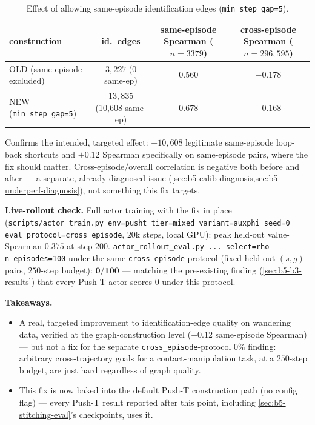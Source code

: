 \documentclass[11pt]{article}
\begin{document}
\begin{table}[h]
\centering
\small
\caption{Effect of allowing same-episode identification edges (\texttt{min\_step\_gap=5}).}
\begin{tabular}{lccc}
\toprule
construction & id.\ edges & same-episode Spearman ($n{=}3379$) & cross-episode Spearman ($n{=}296{,}595$) \\
\midrule
OLD (same-episode excluded) & $3{,}227$ (0 same-ep) & $0.560$ & $-0.178$ \\
NEW (\texttt{min\_step\_gap=5}) & $13{,}835$ (10,608 same-ep) & $\mathbf{0.678}$ & $-0.168$ \\
\bottomrule
\end{tabular}
\end{table}

Confirms the intended, targeted effect: $+10{,}608$ legitimate same-episode loop-back shortcuts
and $+0.12$ Spearman specifically on same-episode pairs, where the fix should matter.
Cross-episode/overall correlation is negative both before and after --- a separate,
already-diagnosed issue (\cref{sec:b5-calib-diagnosis,sec:b5-underperf-diagnosis}), not
something this fix targets.

\textbf{Live-rollout check.} Full actor training with the fix in place
(\texttt{scripts/actor\_train.py env=pusht tier=mixed variant=auxphi seed=0
eval\_protocol=cross\_episode}, $20$k steps, local GPU): peak held-out value-Spearman $0.375$ at
step $200$. \texttt{actor\_rollout\_eval.py ... select=rho n\_episodes=100} under the same
\texttt{cross\_episode} protocol (fixed held-out $(s,g)$ pairs, $250$-step budget):
$\mathbf{0/100}$ --- matching the pre-existing finding (\cref{sec:b5-b3-results}) that every
Push-T actor scores $0$ under this protocol.

\textbf{Takeaways.}
\begin{itemize}[leftmargin=1.4em,itemsep=2pt]
\item A real, targeted improvement to identification-edge quality on wandering data, verified at
the graph-construction level ($+0.12$ same-episode Spearman) --- but not a fix for the separate
\texttt{cross\_episode}-protocol $0\%$ finding: arbitrary cross-trajectory goals for a
contact-manipulation task, at a $250$-step budget, are just hard regardless of graph quality.
\item This fix is now baked into the default Push-T construction path (no config flag) --- every
Push-T result reported after this point, including \cref{sec:b5-stitching-eval}'s checkpoints,
uses it.
\end{itemize}
\end{document}
